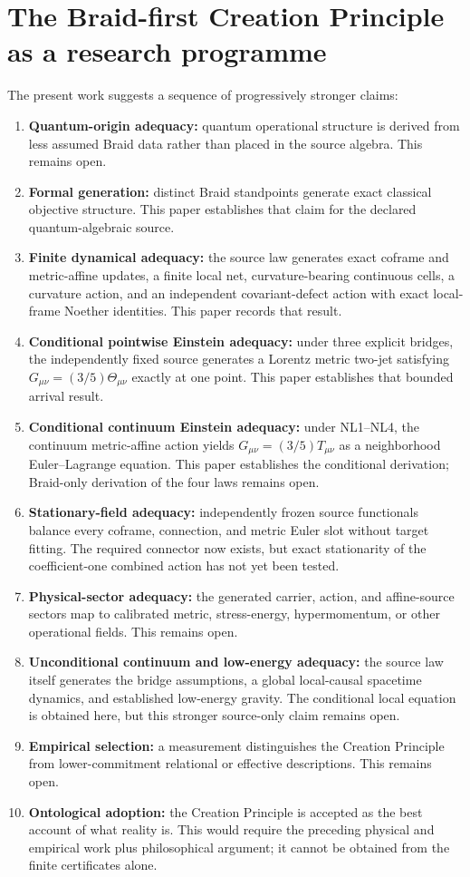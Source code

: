 \documentclass[11pt]{article}
\theoremstyle{definition}
\theoremstyle{remark}
\begin{document}
\section{The Braid-first Creation Principle as a research programme}

The present work suggests a sequence of progressively stronger claims:
\begin{enumerate}
\item \textbf{Quantum-origin adequacy:} quantum operational structure is derived from less assumed Braid data rather than placed in the source algebra. This remains open.
\item \textbf{Formal generation:} distinct Braid standpoints generate exact classical objective structure. This paper establishes that claim for the declared quantum-algebraic source.
\item \textbf{Finite dynamical adequacy:} the source law generates exact coframe and metric-affine updates, a finite local net, curvature-bearing continuous cells, a curvature action, and an independent covariant-defect action with exact local-frame Noether identities. This paper records that result.
\item \textbf{Conditional pointwise Einstein adequacy:} under three explicit bridges, the independently fixed source generates a Lorentz metric two-jet satisfying $G_{\mu\nu}=(3/5)\Theta_{\mu\nu}$ exactly at one point. This paper establishes that bounded arrival result.
\item \textbf{Conditional continuum Einstein adequacy:} under NL1--NL4, the continuum metric-affine action yields $G_{\mu\nu}=(3/5)T_{\mu\nu}$ as a neighborhood Euler--Lagrange equation. This paper establishes the conditional derivation; Braid-only derivation of the four laws remains open.
\item \textbf{Stationary-field adequacy:} independently frozen source functionals balance every coframe, connection, and metric Euler slot without target fitting. The required connector now exists, but exact stationarity of the coefficient-one combined action has not yet been tested.
\item \textbf{Physical-sector adequacy:} the generated carrier, action, and affine-source sectors map to calibrated metric, stress-energy, hypermomentum, or other operational fields. This remains open.
\item \textbf{Unconditional continuum and low-energy adequacy:} the source law itself generates the bridge assumptions, a global local-causal spacetime dynamics, and established low-energy gravity. The conditional local equation is obtained here, but this stronger source-only claim remains open.
\item \textbf{Empirical selection:} a measurement distinguishes the Creation Principle from lower-commitment relational or effective descriptions. This remains open.
\item \textbf{Ontological adoption:} the Creation Principle is accepted as the best account of what reality is. This would require the preceding physical and empirical work plus philosophical argument; it cannot be obtained from the finite certificates alone.
\end{enumerate}
\end{document}
